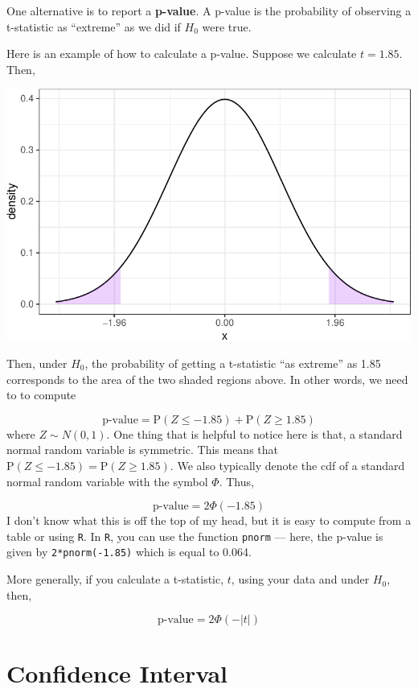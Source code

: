 \documentclass[
  letterpaper,
  DIV=11,
  numbers=noendperiod]{scrreprt}
\begin{document}
One alternative is to report a \textbf{p-value}. A p-value is the
probability of observing a t-statistic as ``extreme'' as we did if
\(H_0\) were true.

Here is an example of how to calculate a p-value. Suppose we calculate
\(t=1.85\). Then,

\includegraphics{03-estimators_files/figure-pdf/unnamed-chunk-4-1.pdf}

Then, under \(H_0\), the probability of getting a t-statistic ``as
extreme'' as 1.85 corresponds to the area of the two shaded regions
above. In other words, we need to to compute

\[
  \textrm{p-value} = \mathrm{P}(Z \leq -1.85) + \mathrm{P}(Z \geq 1.85)
\] where \(Z \sim N(0,1)\). One thing that is helpful to notice here is
that, a standard normal random variable is symmetric. This means that
\(\mathrm{P}(Z \leq -1.85) = \mathrm{P}(Z \geq 1.85)\). We also
typically denote the cdf of a standard normal random variable with the
symbol \(\Phi\). Thus,

\[
  \textrm{p-value} = 2 \Phi(-1.85)
\] I don't know what this is off the top of my head, but it is easy to
compute from a table or using \texttt{R}. In \texttt{R}, you can use the
function \texttt{pnorm} --- here, the p-value is given by
\texttt{2*pnorm(-1.85)} which is equal to 0.064.

More generally, if you calculate a t-statistic, \(t\), using your data
and under \(H_0\), then,

\[
  \textrm{p-value} = 2 \Phi(-|t|)
\]

\section{Confidence Interval}\label{confidence-interval}
\end{document}
